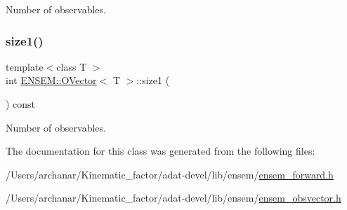 Number of observables. 

\mbox{\label{classENSEM_1_1OVector_af2035852c6cefe80834b8e2a17648113}} 
\subsubsection{\texorpdfstring{size1()}{size1()}\hspace{0.1cm}{\footnotesize\ttfamily [3/3]}}
{\footnotesize\ttfamily template$<$class T $>$ \\
int \mbox{\hyperlink{classENSEM_1_1OVector}{E\+N\+S\+E\+M\+::\+O\+Vector}}$<$ T $>$\+::size1 (\begin{DoxyParamCaption}{ }\end{DoxyParamCaption}) const\hspace{0.3cm}{\ttfamily [inline]}}



Number of observables. 



The documentation for this class was generated from the following files\+:\begin{DoxyCompactItemize}
\item 
/\+Users/archanar/\+Kinematic\+\_\+factor/adat-\/devel/lib/ensem/\mbox{\hyperlink{adat-devel_2lib_2ensem_2ensem__forward_8h}{ensem\+\_\+forward.\+h}}\item 
/\+Users/archanar/\+Kinematic\+\_\+factor/adat-\/devel/lib/ensem/\mbox{\hyperlink{adat-devel_2lib_2ensem_2ensem__obsvector_8h}{ensem\+\_\+obsvector.\+h}}\end{DoxyCompactItemize}
